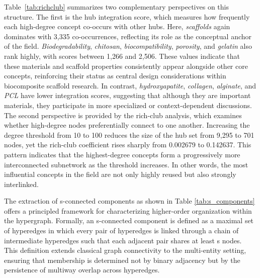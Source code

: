 \documentclass{article}
\begin{document}
Table~\ref{tab:richclub} summarizes two complementary perspectives on this structure. The first is the hub integration score, which measures how frequently each high-degree concept co-occurs with other hubs. Here, \textit{scaffolds} again dominates with 3{,}335 co-occurrences, reflecting its role as the conceptual anchor of the field. \textit{Biodegradability}, \textit{chitosan}, \textit{biocompatibility}, \textit{porosity}, and \textit{gelatin} also rank highly, with scores between 1{,}266 and 2{,}506. These values indicate that these materials and scaffold properties consistently appear alongside other core concepts, reinforcing their status as central design considerations within biocomposite scaffold research. In contrast, \textit{hydroxyapatite}, \textit{collagen}, \textit{alginate}, and \textit{PCL} have lower integration scores, suggesting that although they are important materials, they participate in more specialized or context-dependent discussions. The second perspective is provided by the rich-club analysis, which examines whether high-degree nodes preferentially connect to one another. Increasing the degree threshold from 10 to 100 reduces the size of the hub set from 9{,}295 to 701 nodes, yet the rich-club coefficient rises sharply from 0.002679 to 0.142637. This pattern indicates that the highest-degree concepts form a progressively more interconnected subnetwork as the threshold increases. In other words, the most influential concepts in the field are not only highly reused but also strongly interlinked.

The extraction of s-connected components as shown in Table \ref{tab:s_components} offers a principled framework for characterizing higher-order organization within the hypergraph. Formally, an s-connected component is defined as a maximal set of hyperedges in which every pair of hyperedges is linked through a chain of intermediate hyperedges such that each adjacent pair shares at least s nodes. This definition extends classical graph connectivity to the multi-entity setting, ensuring that membership is determined not by binary adjacency but by the persistence of multiway overlap across hyperedges.
\end{document}
